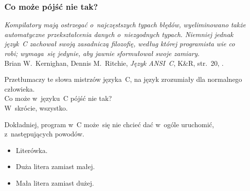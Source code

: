 \documentclass[10pt,t]{beamer}
\begin{document}
\begin{frame}
  \frametitle{Co może pójść nie tak?}


  \textit{Kompilatory mają ostrzegać o~najczęstszych typach błędów,
    wyeliminowano także automatyczne przekształcenia danych o~niezgodnych
    typach. Niemniej jednak język~C zachował swoją zasadniczą filozofię,
    według której programista wie co robi; wymaga~się jedynie, aby jawnie
    sformułował swoje zamiary.} \\
  Brian W.~Kernighan, Dennis M.~Ritchie, \textit{Język ANSI~C}, K\&R,
  str.~20, \parencite{Kernighan-Ritchie-Jezyk-ANSI-C-Pub-2004}.

  Przetłumaczy te słowa mistrzów języka~C, na język zrozumiały dla
  normalnego człowieka. \\
  Co może w~języku~C pójść nie tak? \\
  W~skrócie, wszystko.

  Dokładniej, program w~C może~się nie chcieć dać w~ogóle uruchomić,
  z~następujących powodów.

  \vspace{-0.5em}



  \begin{itemize}

  \item Literówka.

  \item Duża litera zamiast małej.

  \item Mała litera zamiast dużej.

  \end{itemize}

\end{frame}
\end{document}
